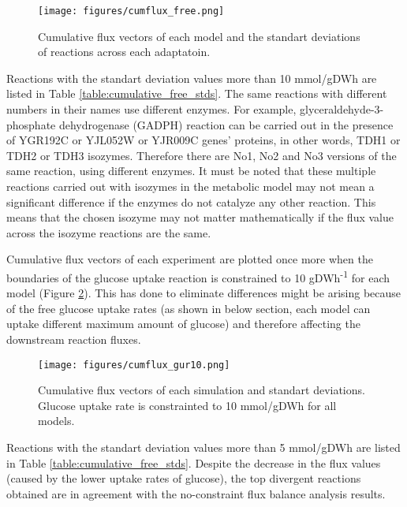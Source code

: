 \begin{figure}[H]
  \begin{center}
  \texttt{[image: figures/cumflux\_free.png]}
  \caption[Cumulative flux vectors of each simulation and standart deviations]{Cumulative flux vectors of each model and the standart deviations of reactions across each adaptatoin.}
  \label{fig:cumflux_free}
  \end{center}
\end{figure}

Reactions with the standart deviation values more than 10 mmol/gDWh are listed in Table \ref{table:cumulative_free_stds}. The same reactions with different numbers in their names use different enzymes. For example, glyceraldehyde-3-phosphate dehydrogenase (GADPH) reaction can be carried out in the presence of YGR192C or YJL052W or YJR009C genes' proteins, in other words, TDH1 or TDH2 or TDH3 isozymes. Therefore there are No1, No2 and No3 versions of the same reaction, using different enzymes. It must be noted that these multiple reactions carried out with isozymes in the metabolic model may not mean a significant difference if the enzymes do not catalyze any other reaction. This means that the chosen isozyme may not matter mathematically if the flux value across the isozyme reactions are the same.


Cumulative flux vectors of each experiment are plotted once more when the boundaries of the glucose uptake reaction is constrained to 10 gDWh\textsuperscript{-1} for each model (Figure \ref{fig:cumflux_gur10}). This has done to eliminate differences might be arising because of the free glucose uptake rates (as shown in below section, each model can uptake different maximum amount of glucose) and therefore affecting the downstream reaction fluxes.

\begin{figure}[H]
  \begin{center}
  \texttt{[image: figures/cumflux\_gur10.png]}
  \caption[Cumulative flux vectors of each experiment when glucose uptake rate is constrained]{Cumulative flux vectors of each simulation and standart deviations. Glucose uptake rate is constrainted to  10 mmol/gDWh for all models. }
  \label{fig:cumflux_gur10}
  \end{center}
\end{figure}

Reactions with the standart deviation values more than 5 mmol/gDWh are listed in Table \ref{table:cumulative_free_stds}. Despite the decrease in the flux values (caused by the lower uptake rates of glucose), the top divergent reactions obtained are in agreement with the no-constraint flux balance analysis results.

